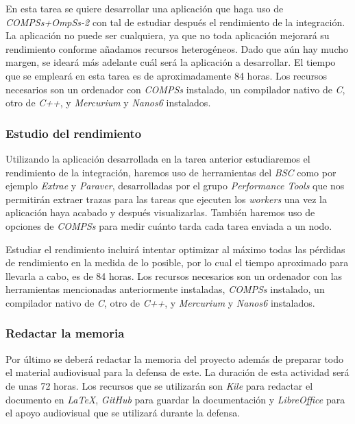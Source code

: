 En esta tarea se quiere desarrollar una aplicación que haga uso de \textit{COMPSs+OmpSs-2} con tal de estudiar después el rendimiento de la integración. La aplicación no puede ser cualquiera, ya que no toda aplicación mejorará su rendimiento conforme añadamos recursos heterogéneos. Dado que aún hay mucho margen, se ideará más adelante cuál será la aplicación a desarrollar. El tiempo que se empleará en esta tarea es de aproximadamente 84 horas. Los recursos necesarios son un ordenador con \textit{COMPSs} instalado, un compilador nativo de \textit{C}, otro de \textit{C++}, y \textit{Mercurium} y \textit{Nanos6} instalados.

\subsubsection{Estudio del rendimiento}

Utilizando la aplicación desarrollada en la tarea anterior estudiaremos el rendimiento de la integración, haremos uso de herramientas del \textit{BSC} como por ejemplo \textit{Extrae} y \textit{Paraver}, desarrolladas por el grupo \textit{Performance Tools} que nos permitirán extraer trazas para las tareas que ejecuten los \textit{workers} una vez la aplicación haya acabado y después visualizarlas. También haremos uso de opciones de \textit{COMPSs} para medir cuánto tarda cada tarea enviada a un nodo.
\par\bigskip

Estudiar el rendimiento incluirá intentar optimizar al máximo todas las pérdidas de rendimiento en la medida de lo posible, por lo cual el tiempo aproximado para llevarla a cabo, es de 84 horas. Los recursos necesarios son un ordenador con las herramientas mencionadas anteriormente instaladas, \textit{COMPSs} instalado, un compilador nativo de \textit{C}, otro de \textit{C++}, y \textit{Mercurium} y \textit{Nanos6} instalados.

\subsubsection{Redactar la memoria}

Por último se deberá redactar la memoria del proyecto además de preparar todo el material audiovisual para la defensa de este. La duración de esta actividad será de unas 72 horas. Los recursos que se utilizarán son \textit{Kile} para redactar el documento en \textit{LaTeX}, \textit{GitHub} para guardar la documentación y \textit{LibreOffice} para el apoyo audiovisual que se utilizará durante la defensa.

